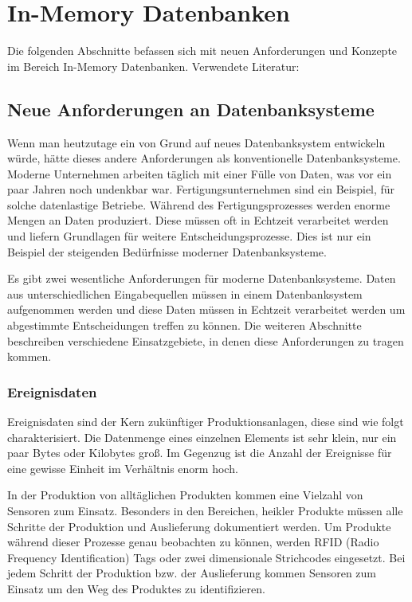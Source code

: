 \documentclass[draft,final]{vutinfth} %
\begin{document}
\chapter{In-Memory Datenbanken} \label{inMemoryDatenbanken}
Die folgenden Abschnitte befassen sich mit neuen Anforderungen und Konzepte im Bereich In-Memory Datenbanken. Verwendete Literatur: \cite{BookInMem}
\section{Neue Anforderungen an Datenbanksysteme}
Wenn man heutzutage ein von Grund auf neues Datenbanksystem entwickeln würde, hätte dieses andere Anforderungen als konventionelle Datenbanksysteme. Moderne Unternehmen arbeiten täglich mit einer Fülle von Daten, was vor ein paar Jahren noch undenkbar war. Fertigungsunternehmen sind ein Beispiel, für solche datenlastige Betriebe. Während des Fertigungsprozesses werden enorme Mengen an Daten produziert. Diese müssen oft in Echtzeit verarbeitet werden und liefern Grundlagen für weitere Entscheidungsprozesse. Dies ist nur ein Beispiel der steigenden Bedürfnisse moderner Datenbanksysteme. 

Es gibt zwei wesentliche Anforderungen für moderne Datenbanksysteme. Daten aus unterschiedlichen Eingabequellen müssen in einem Datenbanksystem aufgenommen werden und diese Daten müssen in Echtzeit verarbeitet werden um abgestimmte Entscheidungen treffen zu können. Die weiteren Abschnitte beschreiben verschiedene Einsatzgebiete, in denen diese Anforderungen zu tragen kommen.

\subsection*{Ereignisdaten}
Ereignisdaten sind der Kern zukünftiger Produktionsanlagen, diese sind wie folgt charakterisiert. Die Datenmenge eines einzelnen Elements ist sehr klein, nur ein paar Bytes oder Kilobytes gro\ss . Im Gegenzug ist die Anzahl der Ereignisse für eine gewisse Einheit im Verhältnis enorm hoch. 

In der Produktion von alltäglichen Produkten kommen eine Vielzahl von Sensoren zum Einsatz. Besonders in den Bereichen, heikler Produkte müssen alle Schritte der Produktion und Auslieferung dokumentiert werden. Um Produkte während dieser Prozesse genau beobachten zu können, werden RFID (Radio Frequency Identification) Tags oder zwei dimensionale Strichcodes eingesetzt. Bei jedem Schritt der Produktion bzw. der Auslieferung kommen Sensoren zum Einsatz um den Weg des Produktes zu identifizieren. 
\end{document}

